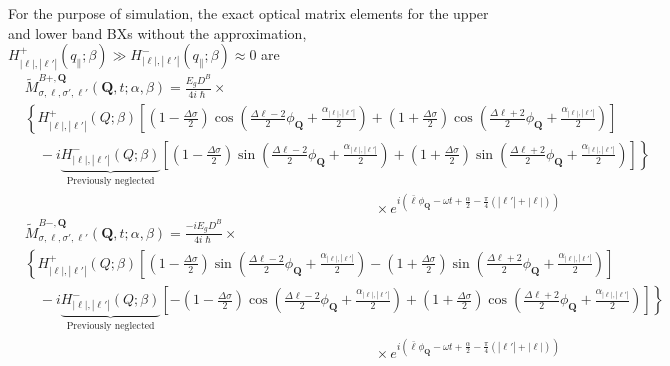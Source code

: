 \noindent
For the purpose of simulation, the exact optical matrix elements for the upper and lower band BXs without the approximation, $H_{\left|\ell\right|,\left|\ell'\right|}^{+}(q_{\parallel}; \beta) \gg H_{\left|\ell\right|,\left|\ell'\right|}^{-}(q_{\parallel}; \beta)\approx 0$ are
\begin{equation}
\begin{aligned}
&\tilde{M}_{\sigma,\ell,\sigma',\ell'}^{B+,\boldsymbol{Q}}(\boldsymbol{Q}, t; \alpha, \beta) 
= \frac{E_g D^B}{4i\hslash} \times \\
& \left\{ H_{|\ell|,|\ell'|}^{+}(Q; \beta) \left[ \left(1 - \tfrac{\Delta\sigma}{2}\right) \cos\left( \tfrac{\Delta\ell - 2}{2}\phi_{\boldsymbol{Q}} + \tfrac{\alpha_{|\ell|,|\ell'|}}{2} \right) + \left(1 + \tfrac{\Delta\sigma}{2}\right) \cos\left( \tfrac{\Delta\ell + 2}{2}\phi_{\boldsymbol{Q}} + \tfrac{\alpha_{|\ell|,|\ell'|}}{2} \right) \right] \right. \\
&\quad - i \underbrace{H_{|\ell|,|\ell'|}^{-}(Q; \beta)}_{\text{Previously neglected}} \left. \left[ \left(1 - \tfrac{\Delta\sigma}{2}\right) \sin\left( \tfrac{\Delta\ell - 2}{2}\phi_{\boldsymbol{Q}} + \tfrac{\alpha_{|\ell|,|\ell'|}}{2} \right) + \left(1 + \tfrac{\Delta\sigma}{2}\right) \sin\left( \tfrac{\Delta\ell + 2}{2}\phi_{\boldsymbol{Q}} + \tfrac{\alpha_{|\ell|,|\ell'|}}{2} \right) \right] \right\} \\[-3pt]
& \hspace{25em}  \times e^{i\left( \bar{\ell}\phi_{\boldsymbol{Q}} - \omega t + \tfrac{\alpha}{2} - \tfrac{\pi}{4} (|\ell'| + |\ell|) \right)}
\end{aligned}
\label{eq:matrixelement_exact_upper_BX}
\end{equation}
\begin{equation}
\begin{aligned}
&\tilde{M}_{\sigma,\ell,\sigma',\ell'}^{B-,\boldsymbol{Q}}(\boldsymbol{Q}, t; \alpha, \beta) 
= \frac{-i E_g D^B}{4i\hslash} \times \\
& \left\{ H_{|\ell|,|\ell'|}^{+}(Q; \beta) \left[ \left(1 - \tfrac{\Delta\sigma}{2}\right) \sin\left( \tfrac{\Delta\ell - 2}{2}\phi_{\boldsymbol{Q}} + \tfrac{\alpha_{|\ell|,|\ell'|}}{2} \right) - \left(1 + \tfrac{\Delta\sigma}{2}\right) \sin\left( \tfrac{\Delta\ell + 2}{2}\phi_{\boldsymbol{Q}} + \tfrac{\alpha_{|\ell|,|\ell'|}}{2} \right) \right] \right. \\
&\quad - i \underbrace{H_{|\ell|,|\ell'|}^{-}(Q; \beta)}_{\text{Previously neglected}} \left. \left[ -\left(1 - \tfrac{\Delta\sigma}{2}\right) \cos\left( \tfrac{\Delta\ell - 2}{2}\phi_{\boldsymbol{Q}} + \tfrac{\alpha_{|\ell|,|\ell'|}}{2} \right) + \left(1 + \tfrac{\Delta\sigma}{2}\right) \cos\left( \tfrac{\Delta\ell + 2}{2}\phi_{\boldsymbol{Q}} + \tfrac{\alpha_{|\ell|,|\ell'|}}{2} \right) \right] \right\} \\[-3pt]
& \hspace{25em}  \times e^{i\left( \bar{\ell}\phi_{\boldsymbol{Q}} - \omega t + \tfrac{\alpha}{2} - \tfrac{\pi}{4} (|\ell'| + |\ell|) \right)}
\end{aligned}
\label{eq:matrixelement_exact_lower_BX}
\end{equation}

